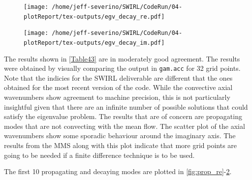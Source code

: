 \begin{figure}[h!]
    \centering
    \texttt{[image: /home/jeff-severino/SWIRL/CodeRun/04-plotReport/tex-outputs/egv\_decay\_re.pdf]}
    \label{fig:decay_re} 
\end{figure}

\begin{figure}[h!]
    \centering
    \texttt{[image: /home/jeff-severino/SWIRL/CodeRun/04-plotReport/tex-outputs/egv\_decay\_im.pdf]}
    \label{fig:decay_im} 
\end{figure}








The results shown in \ref{Table43} are in moderately good agreement. The 
results were obtained by visually comparing the output in \verb|gam.acc| for 32 
grid points. Note that the indicies for the SWIRL deliverable are different that 
the ones obtained for the most recent version of the code. While the 
convective axial wavenumbers show agreement to machine precision, this is not 
particularly insightful given that there are an infinite number of possible solutions 
that could satisfy the eigenvalue problem. The results that are of concern 
are propagating modes that are not convecting with the mean flow.  The scatter plot
of the axial wavenumbers show some sporadic behaviour around the imaginary axis.
The results from the MMS along with this plot indicate that more grid points are going 
to be needed if a finite difference technique is to be used.

The first 10 propagating and decaying modes are plotted in \ref{fig:prop_re}-\ref{fig:decay_im}.





